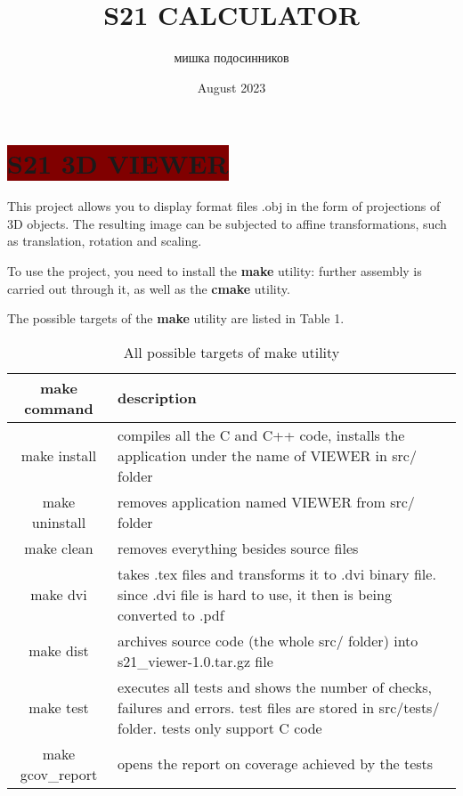 \documentclass{article}
\title{S21 CALCULATOR}
\author{мишка подосинников}
\date{August 2023}
\begin{document}
\color{white}
\section*{\Huge\colorbox{Maroon}{ S21 3D VIEWER}}
This project allows you to display format files .obj in the form of projections of 3D objects. The resulting image can be subjected to affine transformations, such as translation, rotation and scaling.

To use the project, you need to install the {\color{CadetBlue}\textbf{make}} utility: further assembly is carried out through it, as well as the {\color{CadetBlue}\textbf{cmake}} utility.

The possible targets of the {\color{CadetBlue}\textbf{make}} utility are listed in Table 1.

\begin{table}[h!]
    \color{white}
    \centering
    \begin{tabular}{| c | p{10cm} |}
    \hline
    
     make command &  description  \\
    \hline
    \hline
    make install &  compiles all the C and C++ code, installs the application under the name of VIEWER in {\color{Maroon}src/} folder \\
   
     make uninstall & removes application named VIEWER from {\color{Maroon}src/} folder \\
    
     make clean &  removes everything besides source files \\
    
   make dvi &  takes .tex files and transforms it to .dvi binary file. since .dvi file is hard to use, it then is being converted to .pdf \\
   
    make dist &  archives source code (the whole {\color{Maroon}src/} folder) into {\color{Maroon}s21\_viewer-1.0.tar.gz} file \\
    
     make test &  executes all tests and shows the number of checks, failures and errors. test files are stored in {\color{Maroon}src/tests/} folder. tests only support C code \\
     make gcov\_report &  opens the report on coverage achieved by the tests \\

    
    \hline
    \end{tabular}

    \caption{All possible targets of make utility}
    \label{tab1}
\end{table}
\end{document}
